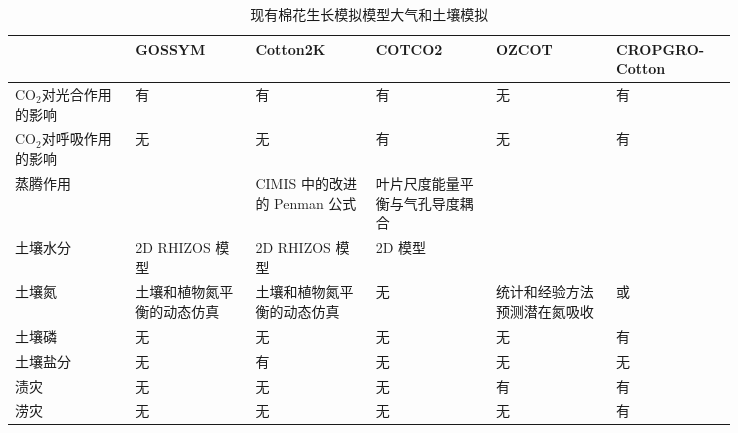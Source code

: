 \documentclass[a4paper,zihao=5]{ctexbook}
\begin{document}
\begin{table}
    \small
    \caption{现有棉花生长模拟模型大气和土壤模拟}
    \label{tab:atmosoil}
    \begin{tabular}{p{0.14\linewidth}p{0.14\linewidth}p{0.14\linewidth}p{0.14\linewidth}p{0.14\linewidth}p{0.14\linewidth}}
        \toprule
                                        & GOSSYM                            & Cotton2K                          & COTCO2                         & OZCOT                        & CROPGRO-Cotton                            \\
        \midrule
        $\mathrm{CO_2}$对光合作用的影响 & 有                                & 有                                & 有                             & 无                           & 有                                        \\
        $\mathrm{CO_2}$对呼吸作用的影响 & 无                                & 无                                & 有                             & 无                           & 有                                        \\
        蒸腾作用                        & \citet{ritchie1972}               & CIMIS 中的改进的 Penman 公式      & 叶片尺度能量平衡与气孔导度耦合 & \citet{ritchie1972}          & \citet{priestley1972,fao56}               \\
        土壤水分                        & 2D RHIZOS 模型 \cite{lambert1976} & 2D RHIZOS 模型 \cite{lambert1976} & 2D 模型                        & \citet{ritchie1972}          & \citet{ritchie1998,ritchie2009}           \\
        土壤氮                          & 土壤和植物氮平衡的动态仿真        & 土壤和植物氮平衡的动态仿真        & 无                             & 统计和经验方法预测潜在氮吸收 & \citet{godwin1998} 或 \citet{gijsman2002} \\
        土壤磷                          & 无                                & 无                                & 无                             & 无                           & 有                                        \\
        土壤盐分                        & 无                                & 有                                & 无                             & 无                           & 无                                        \\
        渍灾                            & 无                                & 无                                & 无                             & 有                           & 有                                        \\
        涝灾                            & 无                                & 无                                & 无                             & 无                           & 有                                        \\
        \bottomrule
    \end{tabular}
\end{table}
\printbibliography
\end{document}
